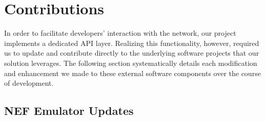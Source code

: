 \chapter{Contributions}

In order to facilitate developers’ interaction with the network, our project implements a dedicated API layer. Realizing this functionality, however, required us to update and contribute directly to the underlying software projects that our solution leverages. The following section systematically details each modification and enhancement we made to these external software components over the course of development.

\section{NEF Emulator Updates}



